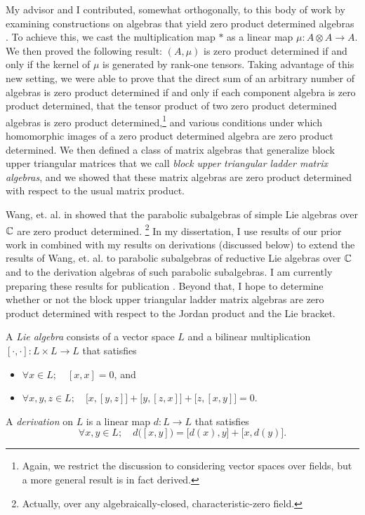 \documentclass[11pt]{article}
\begin{document}
My advisor and I contributed, somewhat orthogonally, to this body of
work by examining constructions on algebras that yield zero product
determined algebras \cite{brice2015zero}. To achieve this, we cast the
multiplication map $\ast$ as a linear map $\mu : A \otimes A \to A$.
We then proved the following result:
$(A, \mu)$ is zero product determined if and only if the kernel of $\mu$
is generated by rank-one tensors.
Taking advantage of this new setting, we were able to prove that the
direct sum of an arbitrary number of algebras is zero product determined
if and only if each component algebra is zero product determined, that
the tensor product of two zero product determined algebras is zero
product determined,\footnote{Again, we restrict the discussion to
considering vector spaces over fields, but a more general result is in
fact derived.} and various conditions under which homomorphic images of
a zero product determined algebra are zero product determined.
We then defined a class of matrix algebras that generalize block upper
triangular matrices that we call \emph{block upper triangular ladder
matrix algebras}, and we showed that these matrix algebras are zero
product determined with respect to the usual matrix product.

Wang, et. al. in \cite{wang2011class} showed that the parabolic
subalgebras of simple Lie algebras over $\mathbb{C}$ are zero product
determined.
\footnote{Actually, over any algebraically-closed, characteristic-zero
field.}
In my dissertation, I use results of our prior work in
\cite{brice2015zero} combined with my results on derivations
(discussed below) to extend the results of Wang, et. al. to parabolic
subalgebras of reductive Lie algebras over $\mathbb{C}$ and to the derivation
algebras of such parabolic subalgebras. I am currently preparing these
results for publication \cite{brice0000note}.
Beyond that, I hope to determine whether or not the block upper
triangular ladder matrix algebras are zero product determined with
respect to the Jordan product and the Lie bracket.


A \emph{Lie algebra} consists of a vector space $L$ and a bilinear
multiplication $[\cdot,\cdot]: L \times L \to L$ that satisfies
\begin{itemize}
	\item[] $\forall x \in L;\quad [x,x] = 0$, and
	\item[] $\forall x,y,z \in L;\quad
    \big[x,[y,z]\big]+\big[y,[z,x]\big]+\big[z,[x,y]\big]=0$.
\end{itemize}
A \emph{derivation} on $L$ is a linear map $d: L \to L$ that satisfies
\[
  \forall x,y \in L;\quad
  d\big([x,y]\big) = \big[d(x),y\big] + \big[x,d(y)\big]
  \text{.}
\]
\end{document}
